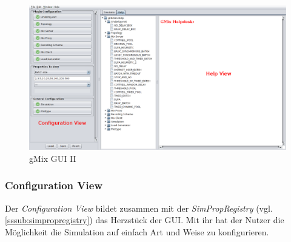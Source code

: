 \documentclass[a4paper, 11pt]{article} %
\begin{document}
\begin{figure}[!htp]
\includegraphics[width=\textwidth]{img/gMixGuiHelp}
\caption{gMix GUI II}
\label{fig:gui2}
\end{figure}

\subsubsection{Configuration View} %
\label{ssub:configview}
Der \emph{Configuration View} bildet zusammen mit der \emph{SimPropRegistry} (vgl. \ref{sssub:simpropregistry}) das Herzstück der GUI. Mit ihr hat der Nutzer die Möglichkeit die Simulation auf einfach Art und Weise zu konfigurieren. \\
\end{document}
